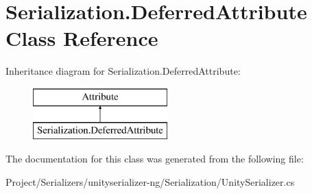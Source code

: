 \hypertarget{class_serialization_1_1_deferred_attribute}{}\section{Serialization.\+Deferred\+Attribute Class Reference}
\label{class_serialization_1_1_deferred_attribute}
Inheritance diagram for Serialization.\+Deferred\+Attribute\+:\begin{figure}[H]
\begin{center}
\leavevmode
\includegraphics[height=2.000000cm]{class_serialization_1_1_deferred_attribute}
\end{center}
\end{figure}


The documentation for this class was generated from the following file\+:\begin{DoxyCompactItemize}
\item 
Project/\+Serializers/unityserializer-\/ng/\+Serialization/Unity\+Serializer.\+cs\end{DoxyCompactItemize}
